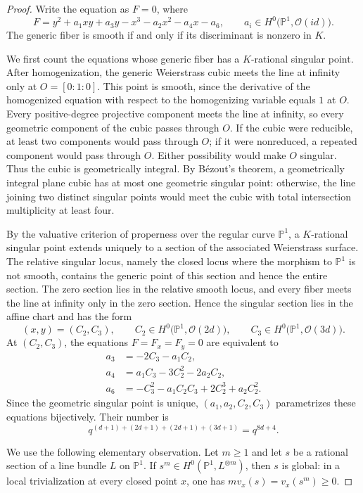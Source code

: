 \documentclass[10pt,a4paper]{amsart}
\newcommand{\Pb}{\mathbb{P}}
\begin{document}
\begin{proof}
Write the equation as $F=0$, where
\[
F
=
y^2+a_1xy+a_3y-x^3-a_2x^2-a_4x-a_6,
\qquad
a_i\in H^0\bigl(\Pb^1,\mathcal O(id)\bigr).
\]
The generic fiber is smooth if and only if its discriminant is nonzero in $K$.

We first count the equations whose generic fiber has a $K$-rational singular point.  After homogenization, the generic Weierstrass cubic meets the line at infinity only at $O=[0:1:0]$.  This point is smooth, since the derivative of the homogenized equation with respect to the homogenizing variable equals $1$ at $O$.  Every positive-degree projective component meets the line at infinity, so every geometric component of the cubic passes through $O$.  If the cubic were reducible, at least two components would pass through $O$; if it were nonreduced, a repeated component would pass through $O$.  Either possibility would make $O$ singular.  Thus the cubic is geometrically integral.  By B\'ezout's theorem, a geometrically integral plane cubic has at most one geometric singular point: otherwise, the line joining two distinct singular points would meet the cubic with total intersection multiplicity at least four.

By the valuative criterion of properness over the regular curve $\Pb^1$, a $K$-rational singular point extends uniquely to a section of the associated Weierstrass surface.  The relative singular locus, namely the closed locus where the morphism to $\Pb^1$ is not smooth, contains the generic point of this section and hence the entire section.  The zero section lies in the relative smooth locus, and every fiber meets the line at infinity only in the zero section.  Hence the singular section lies in the affine chart and has the form
\[
(x,y)=(C_2,C_3),
\qquad
C_2\in H^0\bigl(\Pb^1,\mathcal O(2d)\bigr),
\qquad
C_3\in H^0\bigl(\Pb^1,\mathcal O(3d)\bigr).
\]
At $(C_2,C_3)$, the equations $F=F_x=F_y=0$ are equivalent to
\[
\begin{aligned}
a_3&=-2C_3-a_1C_2,\\
a_4&=a_1C_3-3C_2^2-2a_2C_2,\\
a_6&=-C_3^2-a_1C_2C_3+2C_2^3+a_2C_2^2.
\end{aligned}
\]
Since the geometric singular point is unique, $(a_1,a_2,C_2,C_3)$ parametrizes these equations bijectively.  Their number is
\[
q^{(d+1)+(2d+1)+(2d+1)+(3d+1)}=q^{8d+4}.
\]

We use the following elementary observation.  Let $m\geq1$ and let $s$ be a rational section of a line bundle $L$ on $\Pb^1$.  If $s^m\in H^0(\Pb^1,L^{\otimes m})$, then $s$ is global: in a local trivialization at every closed point $x$, one has $m v_x(s)=v_x(s^m)\geq0$.


\end{proof}
\end{document}
